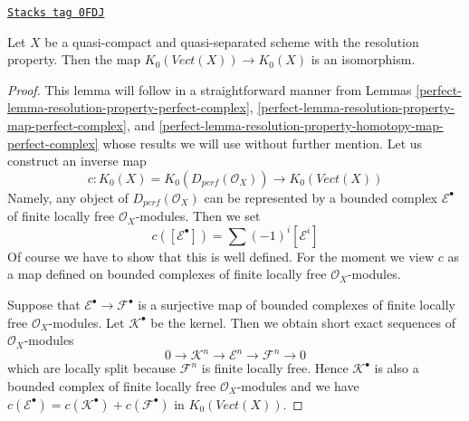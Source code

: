 \begin{lemma}[K is old K]
\label{perfect-lemma-K-is-old-K}
\href{https://stacks.math.columbia.edu/tag/0FDJ}{\texttt{Stacks tag 0FDJ}}

Let $X$ be a quasi-compact and quasi-separated scheme with the
resolution property. Then the map $K_0(\textit{Vect}(X)) \to K_0(X)$
is an isomorphism.
\end{lemma}

\begin{proof}

This lemma will follow in a straightforward manner from
Lemmas \ref{perfect-lemma-resolution-property-perfect-complex},
\ref{perfect-lemma-resolution-property-map-perfect-complex}, and
\ref{perfect-lemma-resolution-property-homotopy-map-perfect-complex}
whose results we will use without further mention.
Let us construct an inverse map
$$
c : K_0(X) = K_0(D_{perf}(\mathcal{O}_X)) \longrightarrow
K_0(\textit{Vect}(X))
$$
Namely, any object of $D_{perf}(\mathcal{O}_X)$ can be represented
by a bounded complex $\mathcal{E}^\bullet$ of finite locally free
$\mathcal{O}_X$-modules. Then we set
$$
c([\mathcal{E}^\bullet]) = \sum (-1)^i[\mathcal{E}^i]
$$
Of course we have to show that this is well defined. For the moment
we view $c$ as a map defined on bounded complexes of finite locally free
$\mathcal{O}_X$-modules.

\medskip\noindent
Suppose that $\mathcal{E}^\bullet \to \mathcal{F}^\bullet$ is a surjective map
of bounded complexes of finite locally free $\mathcal{O}_X$-modules.
Let $\mathcal{K}^\bullet$ be the kernel. Then we obtain short exact
sequences of $\mathcal{O}_X$-modules
$$
0 \to \mathcal{K}^n \to \mathcal{E}^n \to \mathcal{F}^n \to 0
$$
which are locally split because $\mathcal{F}^n$ is finite locally free.
Hence $\mathcal{K}^\bullet$ is also a bounded complex of finite
locally free $\mathcal{O}_X$-modules and we have
$c(\mathcal{E}^\bullet) = c(\mathcal{K}^\bullet) + c(\mathcal{F}^\bullet)$
in $K_0(\textit{Vect}(X))$.


\end{proof}
